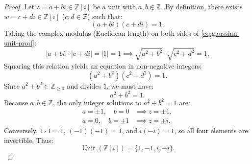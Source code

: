 \begin{content}



\begin{proof}
Let $z = a + bi \in \mathbb{Z}[i]$ be a unit with $a, b \in \mathbb{Z}$. By definition, there exists $w = c + di \in \mathbb{Z}[i]$ ($c, d \in \mathbb{Z}$) such that:
\begin{equation}\label{eq:gaussian-unit-prod}
(a + bi)(c + di) = 1.
\end{equation}
Taking the complex modulus (Euclidean length) on both sides of \eqref{eq:gaussian-unit-prod}:
\[
|a + bi| \cdot |c + di| = |1| = 1 \implies \sqrt{a^2 + b^2} \cdot \sqrt{c^2 + d^2} = 1.
\]
Squaring this relation yields an equation in non-negative integers:
\begin{equation}\label{eq:norm-mult-equation}
(a^2 + b^2)(c^2 + d^2) = 1.
\end{equation}
Since $a^2 + b^2 \in \mathbb{Z}_{\ge 0}$ and divides $1$, we must have:
\[
a^2 + b^2 = 1.
\]
Because $a, b \in \mathbb{Z}$, the only integer solutions to $a^2 + b^2 = 1$ are:
\begin{align*}
a = \pm 1, \quad b = 0 &\implies z = \pm 1, \\
a = 0, \quad b = \pm 1 &\implies z = \pm i.
\end{align*}
Conversely, $1 \cdot 1 = 1$, $(-1)(-1) = 1$, and $i(-i) = 1$, so all four elements are invertible. Thus:
\[
\operatorname{Unit}(\mathbb{Z}[i]) = \{1, -1, i, -i\}.
\]
\end{proof}


\end{content}
